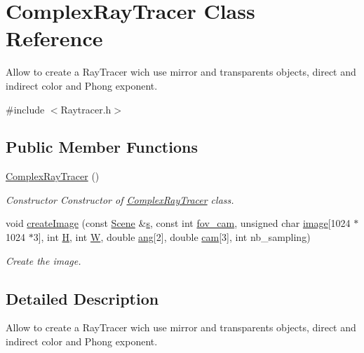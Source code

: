 \hypertarget{classComplexRayTracer}{}\section{Complex\+Ray\+Tracer Class Reference}
\label{classComplexRayTracer}


Allow to create a Ray\+Tracer wich use mirror and transparents objects, direct and indirect color and Phong exponent.  




{\ttfamily \#include $<$Raytracer.\+h$>$}

\subsection*{Public Member Functions}
\begin{DoxyCompactItemize}
\item 
\mbox{\label{classComplexRayTracer_a41893b2dd0c215b9cebb3e2e1be4f24a}} 
\hyperlink{classComplexRayTracer_a41893b2dd0c215b9cebb3e2e1be4f24a}{Complex\+Ray\+Tracer} ()
\begin{DoxyCompactList}\small\item\em Constructor Constructor of \hyperlink{classComplexRayTracer}{Complex\+Ray\+Tracer} class. \end{DoxyCompactList}\item 
void \hyperlink{classComplexRayTracer_a7f1ed1f42ac218e4aaf54fc81df39386}{create\+Image} (const \hyperlink{classScene}{Scene} \&\hyperlink{test_8cpp_aecc1396fc611f6e71d5d70228e7b089a}{s}, const int \hyperlink{test_8cpp_afac324b61ac0563c734fcdb81d98e344}{fov\+\_\+cam}, unsigned char \hyperlink{test_8cpp_a92ebae258b9cd4407b2510c3d18633ee}{image}\mbox{[}1024 $\ast$1024 $\ast$3\mbox{]}, int \hyperlink{test_8cpp_affa487e8e3cc48473cfc05c0ce0165e9}{H}, int \hyperlink{test_8cpp_a2dd51e03005d5cb52315290d27f61870}{W}, double \hyperlink{test_8cpp_a861ee06bf1e430650b4437260a119635}{ang}\mbox{[}2\mbox{]}, double \hyperlink{test_8cpp_a9fe883a18727d129289b149e5f0305eb}{cam}\mbox{[}3\mbox{]}, int nb\+\_\+sampling)
\begin{DoxyCompactList}\small\item\em Create the image. \end{DoxyCompactList}\end{DoxyCompactItemize}


\subsection{Detailed Description}
Allow to create a Ray\+Tracer wich use mirror and transparents objects, direct and indirect color and Phong exponent. 

